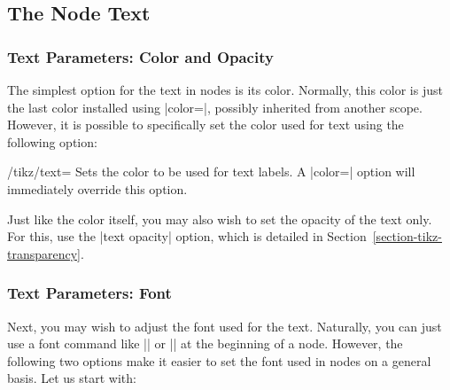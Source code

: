 \subsection{The Node Text}
\label{section-nodes-options}

\subsubsection{Text Parameters: Color and Opacity}

The simplest option for the text in nodes is its color. Normally, this color is
just the last color installed using |color=|, possibly inherited from another
scope. However, it is possible to specifically set the color used for text
using the following option:

\begin{key}{/tikz/text=}
    Sets the color to be used for text labels. A |color=| option will
    immediately override this option.
\begin{codeexample}[]
\end{codeexample}
\end{key}

Just like the color itself, you may also wish to set the opacity of the text
only. For this, use the |text opacity| option, which is detailed in
Section~\ref{section-tikz-transparency}.


\subsubsection{Text Parameters: Font}

Next, you may wish to adjust the font used for the text. Naturally, you can
just use a font command like |\small| or |\rm| at the beginning of a node.
However, the following two options make it easier to set the font used in nodes
on a general basis. Let us start with:

